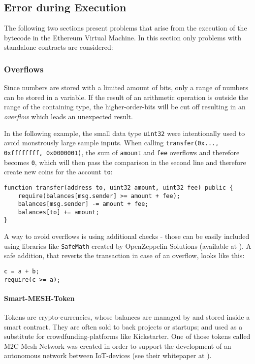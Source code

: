 \subsection{Error during Execution}
The following two sections present problems that arise from the execution of the bytecode in the Ethereum Virtual Machine. In this section only problems with standalone contracts are considered:

\subsubsection{Overflows}
Since numbers are stored with a limited amount of bits, only a range of numbers can be stored in a variable. If the result of an arithmetic operation is outside the range of the containing type, the higher-order-bits will be cut off resulting in an \textit{overflow} which leads an unexpected result.

In the following example, the small data type \texttt{uint32} were intentionally used to avoid monstrously large sample inputs. When calling \texttt{transfer(0x..., 0xffffffff, 0x0000001)}, the sum of \texttt{amount} and \texttt{fee} overflows and therefore becomes \texttt{0}, which will then pass the comparison in the second line and therefore create new coins for the account \texttt{to}:
\begin{verbatim}
function transfer(address to, uint32 amount, uint32 fee) public {
    require(balances[msg.sender] >= amount + fee);
    balances[msg.sender] -= amount + fee;
    balances[to] += amount;
}
\end{verbatim}

A way to avoid overflows is using additional checks - those can be easily included using libraries like \texttt{SafeMath} created by OpenZeppelin Solutions (available at \cite{zeppelin:safemath}). A safe addition, that reverts the transaction in case of an overflow, looks like this:
\begin{verbatim}
c = a + b;
require(c >= a);
\end{verbatim}

\paragraph{Smart-MESH-Token}
Tokens are crypto-currencies, whose balances are managed by and stored inside a smart contract. They are often sold to back projects or startups; and used as a substitute for crowdfunding-platforms like Kickstarter. One of those tokens called M2C Mesh Network was created in order to support the development of an autonomous network between IoT-devices (see their whitepaper at \cite{mesh:whitepaper}).


